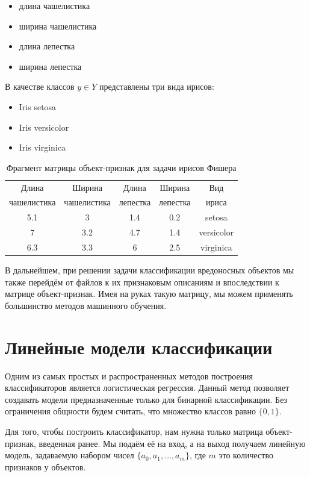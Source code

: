 \begin{itemize}
\item длина чашелистика
\item ширина чашелистика
\item длина лепестка
\item ширина лепестка
\end{itemize}

В качестве классов $y \in Y$ представлены три вида ирисов:
\begin{itemize}
\item Iris setosa
\item Iris versicolor
\item Iris virginica 
\end{itemize}


\begin{table}[ht]
\caption{Фрагмент матрицы объект-признак для задачи ирисов Фишера}
\label{tab_weight}
\centering
    \begin{tabular}{|c|c|c|c|c|}
    \hline Длина  & Ширина  & Длина  & Ширина  & Вид  \\
    чашелистика & чашелистика & лепестка & лепестка & ириса \\
    \hline 5.1 & 3 & 1.4 & 0.2 & setosa  \\
    \hline 7 & 3.2 & 4.7 & 1.4 & versicolor  \\
    \hline 6.3 & 3.3 & 6 & 2.5 & virginica  \\
    \hline
    \end{tabular}
\end{table}

В дальнейшем, при решении задачи классификации вредоносных объектов мы также перейдём от файлов к их признаковым описаниям и впоследствии к матрице объект-признак.
Имея на руках такую матрицу, мы можем применять большинство методов машинного обучения.

\section{Линейные модели классификации}

Одним из самых простых и распространенных методов построения классификаторов является логистическая регрессия.
Данный метод позволяет создавать модели предназначенные только для бинарной классификации.
Без ограничения общности будем считать, что множество классов равно $\{0, 1\}$.

Для того, чтобы построить классификатор, нам нужна только матрица объект-признак, введенная ранее. Мы подаём её на вход, а на выход получаем линейную модель, задаваемую набором чисел $\{a_0, a_1,…, a_m\}$, где $m$ это количество признаков у объектов. 

